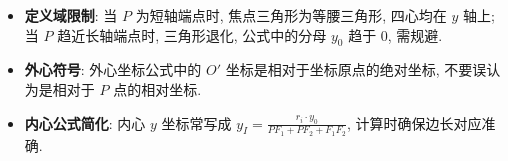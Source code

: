 \begin{trapbox}
\begin{itemize}
    \item \textbf{定义域限制}: 当 $P$ 为短轴端点时, 焦点三角形为等腰三角形, 四心均在 $y$ 轴上; 当 $P$ 趋近长轴端点时, 三角形退化, 公式中的分母 $y_0$ 趋于 0, 需规避.
    \item \textbf{外心符号}: 外心坐标公式中的 $O'$ 坐标是相对于坐标原点的绝对坐标, 不要误认为是相对于 $P$ 点的相对坐标.
    \item \textbf{内心公式简化}: 内心 $y$ 坐标常写成 $y_I = \frac{r_i \cdot y_0}{PF_1+PF_2+F_1F_2}$, 计算时确保边长对应准确.
\end{itemize}
\end{trapbox}